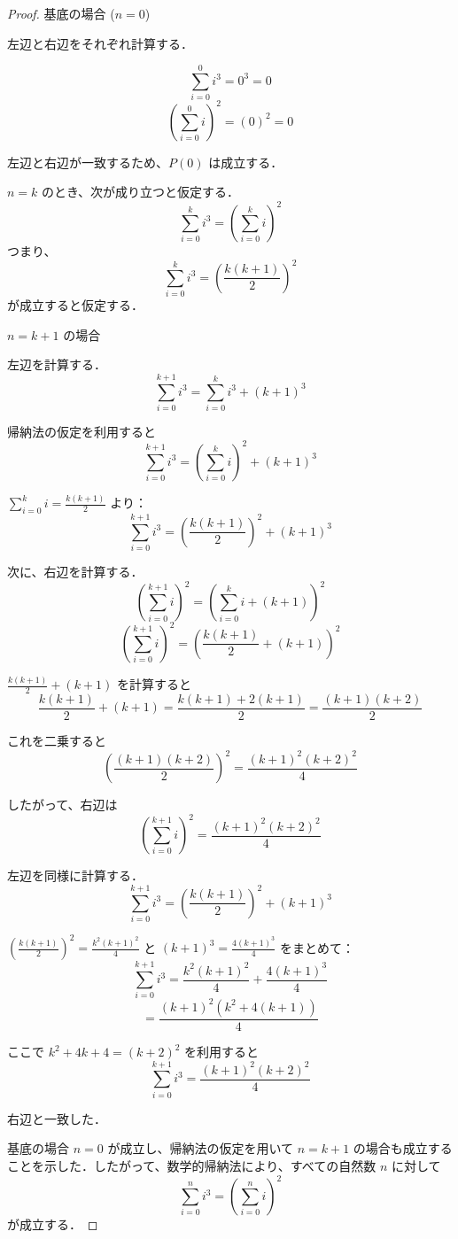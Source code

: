 \documentclass[dvipdfmx]{jlreq}
\begin{document}
			\begin{proof}
				
				基底の場合 ($n = 0$)

				左辺と右辺をそれぞれ計算する．

				\[
				\sum_{i=0}^0 i^3 = 0^3 = 0
				\]
				\[
				\left( \sum_{i=0}^0 i \right)^2 = (0)^2 = 0
				\]

				左辺と右辺が一致するため、$P(0)$ は成立する．				

				$n = k$ のとき、次が成り立つと仮定する．
				\[
				\sum_{i=0}^k i^3 = \left( \sum_{i=0}^k i \right)^2
				\]
				つまり、
				\[
				\sum_{i=0}^k i^3 = \left( \frac{k(k+1)}{2} \right)^2
				\]
				が成立すると仮定する．

				$n = k+1$ の場合

				左辺を計算する．
				\[
				\sum_{i=0}^{k+1} i^3 = \sum_{i=0}^k i^3 + (k+1)^3
				\]

				帰納法の仮定を利用すると
				\[
				\sum_{i=0}^{k+1} i^3 = \left( \sum_{i=0}^k i \right)^2 + (k+1)^3
				\]

				\(\sum_{i=0}^k i = \frac{k(k+1)}{2}\) より：
				\[
				\sum_{i=0}^{k+1} i^3 = \left( \frac{k(k+1)}{2} \right)^2 + (k+1)^3
				\]

				次に、右辺を計算する．
				\[
				\left( \sum_{i=0}^{k+1} i \right)^2 = \left( \sum_{i=0}^k i + (k+1) \right)^2
				\]
				\[
				\left( \sum_{i=0}^{k+1} i \right)^2 = \left( \frac{k(k+1)}{2} + (k+1) \right)^2
				\]

				\(\frac{k(k+1)}{2} + (k+1)\) を計算すると
				\[
				\frac{k(k+1)}{2} + (k+1) = \frac{k(k+1) + 2(k+1)}{2} = \frac{(k+1)(k+2)}{2}
				\]

				これを二乗すると
				\[
				\left( \frac{(k+1)(k+2)}{2} \right)^2 = \frac{(k+1)^2(k+2)^2}{4}
				\]

				したがって、右辺は
				\[
				\left( \sum_{i=0}^{k+1} i \right)^2 = \frac{(k+1)^2(k+2)^2}{4}
				\]

				左辺を同様に計算する．
				\[
				\sum_{i=0}^{k+1} i^3 = \left( \frac{k(k+1)}{2} \right)^2 + (k+1)^3
				\]

				\(\left( \frac{k(k+1)}{2} \right)^2 = \frac{k^2(k+1)^2}{4}\) と \((k+1)^3 = \frac{4(k+1)^3}{4}\) をまとめて：
				\[
				\sum_{i=0}^{k+1} i^3 = \frac{k^2(k+1)^2}{4} + \frac{4(k+1)^3}{4}
				\]
				\[
				= \frac{(k+1)^2(k^2 + 4(k+1))}{4}
				\]

				ここで \(k^2 + 4k + 4 = (k+2)^2\) を利用すると
				\[
				\sum_{i=0}^{k+1} i^3 = \frac{(k+1)^2(k+2)^2}{4}
				\]

				右辺と一致した．

				基底の場合 $n=0$ が成立し、帰納法の仮定を用いて $n=k+1$ の場合も成立することを示した．したがって、数学的帰納法により、すべての自然数 $n$ に対して
				\[
				\sum_{i=0}^n i^3 = \left( \sum_{i=0}^n i \right)^2
				\]
				が成立する．

			\end{proof}
\end{document}
